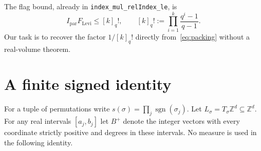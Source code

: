 \documentclass[11pt]{article}
\theoremstyle{remark}\newtheorem{remark}[theorem]{Remark}
\newcommand{\Z}{\mathbb Z}\newcommand{\N}{\mathbb N}\newcommand{\R}{\mathbb R}
\newcommand{\sgn}{\operatorname{sgn}}\newcommand{\im}{\operatorname{im}}\newcommand{\rank}{\operatorname{rank}}
\newcommand{\code}[1]{\texttt{#1}}
\begin{document}
The flag bound, already in \code{index\_mul\_relIndex\_le}, is
\begin{equation}\label{eq:flags}
 I_{\mathrm{par}}F_{\mathrm{Levi}}\leq [k]_q!,\qquad
 [k]_q!:=\prod_{i=1}^k\frac{q^i-1}{q-1}.
\end{equation}
Our task is to recover the factor $1/[k]_q!$ directly from~\eqref{eq:packing} without a real-volume theorem.

\section{A finite signed identity}
For a tuple of permutations write $s(\sigma)=\prod_j\sgn(\sigma_j)$. Let $L_\sigma=T_\sigma\Z^d\subseteq\Z^d$. For any real intervals $[a_j,b_j]$ let $B^+$ denote the integer vectors with every coordinate strictly positive and degrees in these intervals. No measure is used in the following identity.
\end{document}
